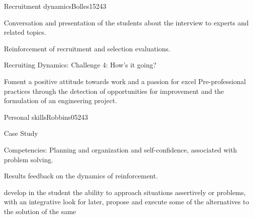 \begin{syllabus}
\begin{unit}{Recruitment dynamics}{}{Bolles15}{24}{3}
   \begin{topics}
      \item Conversation and presentation of the students about the interview to experts and related topics.
      \item Reinforcement of recruitment and selection evaluations.
      \item Recruiting Dynamics: Challenge 4: How's it going?
   \end{topics}

   \begin{learningoutcomes}
      \item Foment a positive attitude towards work and a passion for excel Pre-professional practices through the detection of opportunities for improvement and the formulation of an engineering project.
   \end{learningoutcomes}
\end{unit}

\begin{unit}{Personal skills}{}{Robbins05}{24}{3}
   \begin{topics}
      \item Case Study
      \item Competencies: Planning and organization and self-confidence, associated with problem solving.
      \item Results feedback on the dynamics of reinforcement.
   \end{topics}

   \begin{learningoutcomes}
      \item develop in the student the ability to approach situations assertively or problems, with an integrative look for later, propose and execute some of the alternatives to the solution of the same
   \end{learningoutcomes}
\end{unit}

\begin{coursebibliography}
\end{coursebibliography}

\end{syllabus}
